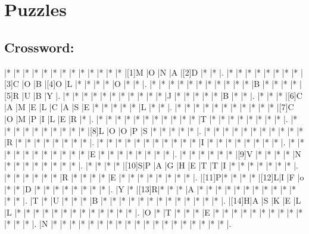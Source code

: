 \documentclass{article}
\begin{document}
\section*{Puzzles}

\subsection*{Crossword:}

\begin{Puzzle}{20}{20} %
|*    |*    |*    |*    |*    |*    |*    |*    |*    |*    |*    |*    |*    |[1]M |O    |N    |A    |[2]D |*    |*    |.
|*    |*    |*    |*    |*    |*    |*    |*    |[3]C |O    |B    |[4]O |L    |*    |*    |*    |*    |O    |*    |*    |.
|*    |*    |*    |*    |*    |*    |*    |*    |*    |*    |*    |B    |*    |*    |*    |*    |[5]R |U    |B    |Y    |.
|*    |*    |*    |*    |*    |*    |*    |*    |*    |*    |*    |J    |*    |*    |*    |*    |*    |B    |*    |*    |.
|*    |*    |*    |[6]C |A    |M    |E    |L    |C    |A    |S    |E    |*    |*    |*    |*    |*    |L    |*    |*    |.
|*    |*    |*    |*    |*    |*    |*    |*    |*    |*    |*    |[7]C |O    |M    |P    |I    |L    |E    |R    |*    |.
|*    |*    |*    |*    |*    |*    |*    |*    |*    |*    |*    |T    |*    |*    |*    |*    |*    |*    |*    |*    |.
|*    |*    |*    |*    |*    |*    |*    |*    |*    |*    |[8]L |O    |O    |P    |S    |*    |*    |*    |*    |*    |.
|*    |*    |*    |*    |*    |*    |*    |*    |*    |*    |*    |R    |*    |*    |*    |*    |*    |*    |*    |*    |.
|*    |*    |*    |*    |*    |*    |*    |*    |*    |*    |*    |I    |*    |*    |*    |*    |*    |*    |*    |*    |.
|*    |*    |*    |*    |*    |*    |*    |*    |*    |*    |*    |E    |*    |*    |*    |*    |*    |*    |*    |*    |.
|*    |*    |*    |*    |*    |*    |[9]V |*    |*    |*    |*    |N    |*    |*    |*    |*    |*    |*    |*    |*    |.
|*    |*    |*    |*    |[10]S|P    |A    |G    |H    |E    |T    |T    |I    |*    |*    |*    |*    |*    |*    |*    |.
|*    |*    |*    |*    |*    |*    |R    |*    |*    |*    |*    |E    |*    |*    |*    |*    |*    |*    |*    |*    |.
|[11]P|*    |*    |*    |*    |[12]L|I    |F    |o    |*    |*    |D    |*    |*    |*    |*    |*    |*    |*    |*    |.
|Y    |*    |[13]R|*    |*    |*    |A    |*    |*    |*    |*    |*    |*    |*    |*    |*    |*    |*    |*    |*    |.
|T    |*    |U    |*    |*    |*    |B    |*    |*    |*    |*    |*    |*    |*    |*    |*    |*    |*    |*    |*    |.
|[14]H|A    |S    |K    |E    |L    |L    |*    |*    |*    |*    |*    |*    |*    |*    |*    |*    |*    |*    |*    |.
|O    |*    |T    |*    |*    |*    |E    |*    |*    |*    |*    |*    |*    |*    |*    |*    |*    |*    |*    |*    |.
|N    |*    |*    |*    |*    |*    |*    |*    |*    |*    |*    |*    |*    |*    |*    |*    |*    |*    |*    |*    |.
\end{Puzzle}
\end{document}
